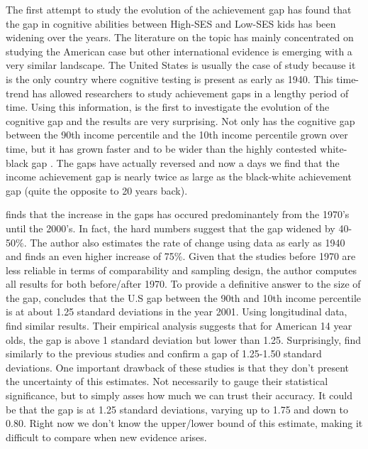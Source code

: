 \documentclass[11pt, a4paper]{article}\usepackage[]{graphicx}\usepackage[]{color}
\begin{document}
The first attempt to study the evolution of the achievement gap has found that the gap in cognitive abilities between High-SES and Low-SES kids has been widening over the years. The literature on the topic has mainly concentrated on studying the American case \citep{reardon2011} but other international evidence is emerging with a very similar landscape. The United States is usually the case of study because it is the only country where cognitive testing is present as early as 1940. This time-trend has allowed researchers to study achievement gaps in a lengthy period of time. Using this information, \citet{reardon2011} is the first to investigate the evolution of the cognitive gap and the results are very surprising. Not only has the cognitive gap between the 90th income percentile and the 10th income percentile grown over time, but it has grown faster and to be wider than the highly contested white-black gap \citep{magnuson2008}. The gaps have actually reversed and now a days we find that the income achievement gap is nearly twice as large as the black-white achievement gap (quite the opposite to 20 years back).

\citet{reardon2011} finds that the increase in the gaps has occured predominantely from the 1970's until the 2000's. In fact, the hard numbers suggest that the gap widened by 40-50\%. The author also estimates the rate of change using data as early as 1940 and finds an even higher increase of   75\%. Given that the studies before 1970 are less reliable in terms of comparability and sampling design, the author computes all results for both before/after 1970. To provide a definitive answer to the size of the gap, \citet{reardon2011} concludes that the U.S gap between the 90th and 10th income percentile is at about 1.25 standard deviations in the year 2001. Using longitudinal data, \citet{bradbury2015} find similar results. Their empirical analysis suggests that for American 14 year olds, the gap is above 1 standard deviation but lower than 1.25. Surprisingly, \citet{duncan2011} find similarly to the previous studies and confirm a gap of  1.25-1.50 standard deviations. One important drawback of these studies is that they don't present the uncertainty of this estimates. Not necessarily to gauge their statistical significance, but to simply asses how much we can trust their accuracy. It could be that the gap is at  1.25 standard deviations, varying up to 1.75 and down to 0.80. Right now we don't know the upper/lower bound of this estimate, making it difficult to compare when new evidence arises.
\end{document}
